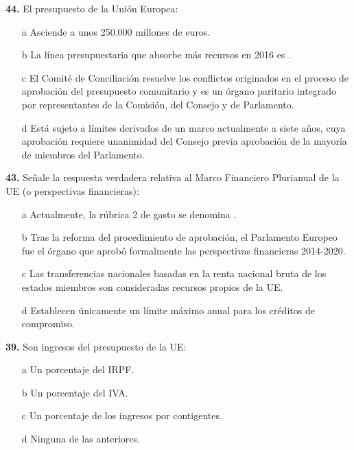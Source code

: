 \documentclass{nuevotema}
\begin{document}
\textbf{44.} El presupuesto de la Unión Europea:
\begin{enumerate}
	\item[a] Asciende a unos 250.000 millones de euros.
	\item[b] La línea presupuestaria que absorbe más recursos en 2016 es .
	\item[c] El Comité de Conciliación resuelve los conflictos originados en el proceso de aprobación del presupuesto comunitario y es un órgano paritario integrado por representantes de la Comisión, del Consejo y de Parlamento.
	\item[d] Está sujeto a límites derivados de un marco actualmente a siete años, cuya aprobación requiere unanimidad del Consejo previa aprobación de la mayoría de miembros del Parlamento.
\end{enumerate}

\textbf{43.} Señale la respuesta verdadera relativa al Marco Financiero Plurianual de la UE (o perspectivas financieras):
\begin{enumerate}
	\item[a] Actualmente, la rúbrica 2 de gasto se denomina .
	\item[b] Tras la reforma del procedimiento de aprobación, el Parlamento Europeo fue el órgano que aprobó formalmente las perspectivas financieras 2014-2020.
	\item[c] Las transferencias nacionales basadas en la renta nacional bruta de los estados miembros son consideradas recursos propios de la UE.
	\item[d] Establecen únicamente un límite máximo anual para los créditos de compromiso.
\end{enumerate}

\textbf{39.} Son ingresos del presupuesto de la UE:
\begin{enumerate}
	\item[a] Un porcentaje del IRPF.
	\item[b] Un porcentaje del IVA.
	\item[c] Un porcentaje de los ingresos por contigentes.
	\item[d] Ninguna de las anteriores.
\end{enumerate}
\end{document}
